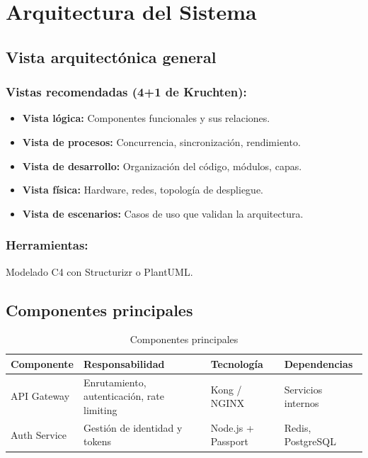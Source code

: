 \documentclass[a4paper,11pt,spanish]{article}
\begin{document}
\newpage

\section{Arquitectura del Sistema}

\subsection{Vista arquitectónica general}

\subsubsection*{Vistas recomendadas (4+1 de Kruchten):}

\begin{itemize}
    \item \textbf{Vista lógica:} Componentes funcionales y sus relaciones.
    \item \textbf{Vista de procesos:} Concurrencia, sincronización, rendimiento.
    \item \textbf{Vista de desarrollo:} Organización del código, módulos, capas.
    \item \textbf{Vista física:} Hardware, redes, topología de despliegue.
    \item \textbf{Vista de escenarios:} Casos de uso que validan la arquitectura.
\end{itemize}

\subsubsection*{Herramientas:} Modelado C4 con Structurizr o PlantUML.

\vspace{1em}

\subsection{Componentes principales}

\begin{table}[H]
\centering
\caption{Componentes principales}
\label{tab:componentes}
\begin{tabular}{@{}llll@{}}
\toprule
\textbf{Componente} & \textbf{Responsabilidad} & \textbf{Tecnología} & \textbf{Dependencias} \\
\midrule
API Gateway & Enrutamiento, autenticación, rate limiting & Kong / NGINX & Servicios internos \\
Auth Service & Gestión de identidad y tokens & Node.js + Passport & Redis, PostgreSQL \\
\bottomrule
\end{tabular}
\end{table}
\end{document}

